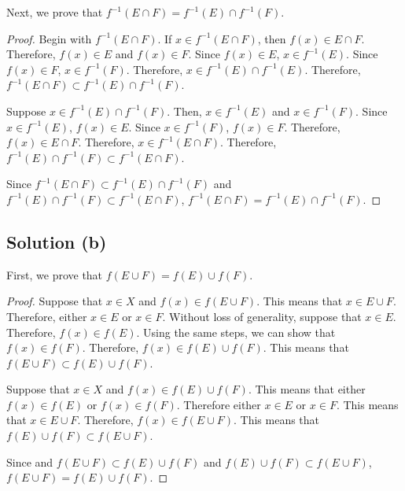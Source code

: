 \documentclass[11pt]{article}
\begin{document}
        Next, we prove that $f^{-1}(E \cap F) = f^{-1}(E) \cap f^{-1}(F)$.
        \begin{proof}
            Begin with $f^{-1}(E \cap F)$.
            If $x \in f^{-1}(E \cap F)$, then $f(x) \in E \cap F$.
            Therefore, $f(x) \in E$ and $f(x) \in F$.
            Since $f(x) \in E$, $x \in f^{-1}(E)$.
            Since $f(x) \in F$, $x \in f^{-1}(F)$.
            Therefore, $x \in f^{-1}(E) \cap f^{-1}(E)$.
            Therefore, $f^{-1}(E \cap F) \subset f^{-1}(E) \cap f^{-1}(F)$.

            Suppose $x \in f^{-1}(E) \cap f^{-1}(F)$.
            Then, $x \in f^{-1}(E)$ and $x \in f^{-1}(F)$.
            Since $x \in f^{-1}(E)$, $f(x) \in E$.
            Since $x \in f^{-1}(F)$, $f(x) \in F$.
            Therefore, $f(x) \in E \cap F$.
            Therefore, $x \in f^{-1}(E \cap F)$.
            Therefore, $f^{-1}(E) \cap f^{-1}(F) \subset f^{-1}(E \cap F)$.

            Since $f^{-1}(E \cap F) \subset f^{-1}(E) \cap f^{-1}(F)$ and $f^{-1}(E) \cap f^{-1}(F) \subset f^{-1}(E \cap F)$, $f^{-1}(E \cap F) = f^{-1}(E) \cap f^{-1}(F)$.
        \end{proof}

    \subsection{Solution (b)}
        First, we prove that $f(E \cup F) = f(E) \cup f(F)$.
        \begin{proof}
            Suppose that $x \in X$ and $f(x) \in f(E \cup F)$.
            This means that $x \in E \cup F$.
            Therefore, either $x \in E$ or $x \in F$.
            Without loss of generality, suppose that $x \in E$.
            Therefore, $f(x) \in f(E)$.
            Using the same steps, we can show that $f(x) \in f(F)$.
            Therefore, $f(x) \in f(E) \cup f(F)$.
            This means that $f(E \cup F) \subset f(E) \cup f(F)$.

            Suppose that $x \in X$ and $f(x) \in f(E) \cup f(F)$.
            This means that either $f(x) \in f(E)$ or $f(x) \in f(F)$.
            Therefore either $x \in E$ or $x \in F$.
            This means that $x \in E \cup F$.
            Therefore, $f(x) \in f(E \cup F)$.
            This means that $f(E) \cup f(F) \subset f(E \cup F)$.

            Since and $f(E \cup F) \subset f(E) \cup f(F)$ and $f(E) \cup f(F) \subset f(E \cup F)$, $f(E \cup F) = f(E) \cup f(F)$.
        \end{proof}
\end{document}
